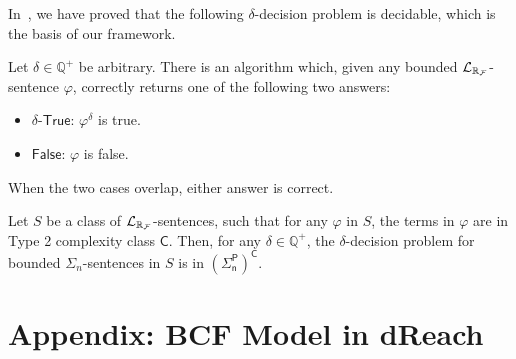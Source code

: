 In~\cite{dreal}, we have proved that the following $\delta$-decision problem is decidable, which is the basis of our framework.
\begin{theorem}\label{delta-decide} Let $\delta\in\mathbb{Q}^+$ be
arbitrary. There is an algorithm which, given any bounded $\mathcal{L}_{\mathbb{R}_{\mathcal{F}}}$-sentence $\varphi$,
correctly returns one of the following two answers:
\begin{itemize}
\item $\delta$-$\mathsf{True}$: $\varphi^{\delta}$ is true.
\item $\mathsf{False}$: $\varphi$ is false.
\end{itemize}
When the two cases overlap, either answer is correct.
\end{theorem}
\begin{theorem}[Complexity]\label{compmain}
Let $S$ be a class of $\mathcal{L}_{\mathbb{R}_{\mathcal{F}}}$-sentences, such that for any $\varphi$ in $S$, the terms in $\varphi$ are in Type 2 complexity class $\mathsf{C}$. Then, for any $\delta\in \mathbb{Q}^+$, the $\delta$-decision problem for bounded $\Sigma_n$-sentences in $S$ is in $\mathsf{(\Sigma_n^P)^C}$.
\end{theorem}


\section*{Appendix: BCF Model in dReach}

